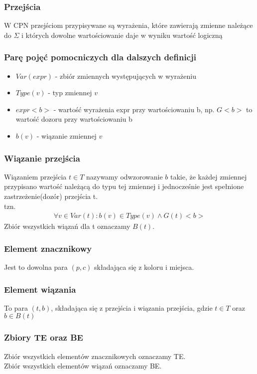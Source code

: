 \documentclass[a4paper,15pt]{article}
\begin{document}
\subsubsection{Przejścia}
W CPN przejściom przypisywane są wyrażenia, które zawierają zmienne należące do $\Sigma$ i których dowolne wartościowanie daje w wyniku wartość logiczną


\subsubsection{Parę pojęć pomocniczych dla dalszych definicji}
\begin{itemize}
\item $Var(expr)$ - zbiór zmiennych występujących w wyrażeniu
\item $Type(v)$ - typ zmiennej $v$
\item $expr<b>$ - wartość wyrażenia expr przy wartościowaniu b, np. $G<b>$ to wartość dozoru przy wartościowaniu b
\item $b(v)$ - wiązanie zmiennej $v$
\end{itemize}

\subsubsection{Wiązanie przejścia}
Wiązaniem przejścia $t \in T$ nazywamy odwzorowanie $b$ takie, że każdej zmiennej przypisano wartość należącą do typu tej zmiennej i jednocześnie jest spełnione zastrzeżenie(dozór) przejścia t. \\ 
tzn.
\begin{align*}
\forall v \in Var(t): b(v) \in Type(v) \wedge G(t)<b>
\end{align*}
Zbiór wszystkich wiązań dla t oznaczamy $B(t)$.

\subsubsection{Element znacznikowy}
Jest to dowolna para $(p,c)$ składająca się z koloru i miejsca.  

\subsubsection{Element wiązania}
To para $(t,b)$, składająca się z przejścia i wiązania przejścia, gdzie $t \in T$ oraz $b \in B(t)$

\subsubsection{Zbiory TE oraz BE}
Zbiór wszystkich elementów znacznikowych oznaczamy TE. \\
Zbiór wszystkich elementów wiązań oznaczamy BE. 
\end{document}
